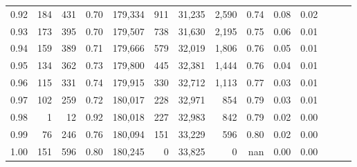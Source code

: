 \begin{tabular}{rrrrrrrrrrrrrr}
0.92 &    184 &  431 &  0.70 &  179,334 &      911 &  31,235 &   2,590 &  0.74 &  0.08 &      0.02 \\
0.93 &    173 &  395 &  0.70 &  179,507 &      738 &  31,630 &   2,195 &  0.75 &  0.06 &      0.01 \\
0.94 &    159 &  389 &  0.71 &  179,666 &      579 &  32,019 &   1,806 &  0.76 &  0.05 &      0.01 \\
0.95 &    134 &  362 &  0.73 &  179,800 &      445 &  32,381 &   1,444 &  0.76 &  0.04 &      0.01 \\
0.96 &    115 &  331 &  0.74 &  179,915 &      330 &  32,712 &   1,113 &  0.77 &  0.03 &      0.01 \\
0.97 &    102 &  259 &  0.72 &  180,017 &      228 &  32,971 &     854 &  0.79 &  0.03 &      0.01 \\
0.98 &      1 &   12 &  0.92 &  180,018 &      227 &  32,983 &     842 &  0.79 &  0.02 &      0.00 \\
0.99 &     76 &  246 &  0.76 &  180,094 &      151 &  33,229 &     596 &  0.80 &  0.02 &      0.00 \\
1.00 &    151 &  596 &  0.80 &  180,245 &        0 &  33,825 &       0 &   nan &  0.00 &      0.00 \\
\bottomrule
\end{tabular}
